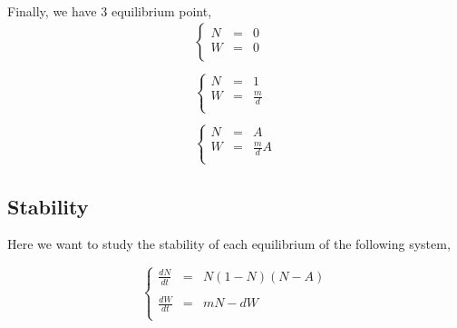 \documentclass{article}
\begin{document}
\paragraph{}
Finally, we have 3 equilibrium point,
\[
\begin{array}{c}
    \left\lbrace
    \begin{array}{rcl}
    N & = & 0 \\
    W & = & 0 \\
    \end{array}
    \right.
    \\
    \\
    \left\lbrace
    \begin{array}{rcl}
    N & = & 1 \\
    W & = & \frac{m}{d} \\
    \end{array}
    \right.
    \\
    \\
    \left\lbrace
    \begin{array}{rcl}
    N & = & A \\
    W & = & \frac{m}{d}A \\
    \end{array}
    \right.
\end{array}
\]

\subsection{Stability}

Here we want to study the stability of each equilibrium of the following system,

\[
\left\lbrace
\begin{array}{rcl}
\frac{dN}{dt} & = & N(1-N)(N-A) \\
\\
\frac{dW}{dt} & = & mN -dW \\
\end{array}
\right.
\]
\end{document}

